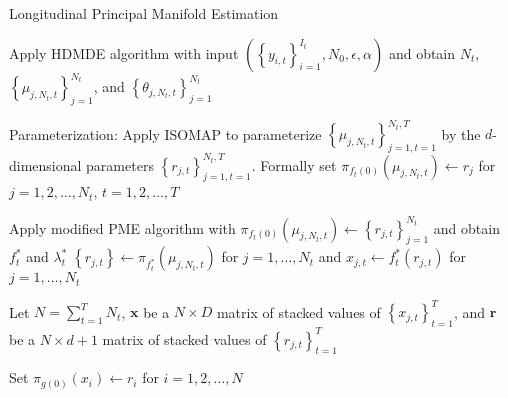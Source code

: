 \documentclass[11pt,reqno]{article}
\theoremstyle{definition}
\begin{document}
\begin{algorithm}
\caption{Longitudinal Principal Manifold Estimation}\label{alg:lpme}
 {
  Apply HDMDE algorithm with input $\left(\left\{y_{i, t}\right\}_{i = 1}^{I_t}, N_0, \epsilon, \alpha\right)$ and obtain $N_t$, $\left\{\mu_{j, N_t, t}\right\}_{j = 1}^{N_t}$, and $\left\{\theta_{j, N_t, t}\right\}_{j = 1}^{N_t}$\;
}

Parameterization: Apply ISOMAP to parameterize $\left\{\mu_{j, N_t, t}\right\}_{j = 1, t = 1}^{N_t, T}$ by the $d$-dimensional parameters $\left\{r_{j, t}\right\}_{j = 1, t = 1}^{N_t, T}$. Formally set $\pi_{f_t(0)}(\mu_{j, N_t, t}) \gets r_j$ for $j = 1, 2, \dots, N_t$, $t = 1, 2, \dots, T$\;

 {
  Apply modified PME algorithm with $\pi_{f_t(0)}(\mu_{j, N_t, t}) \gets \left\{r_{j, t}\right\}_{j = 1}^{N_t}$ and obtain $f_t^*$ and $\lambda_t^*$\;
  $\left\{r_{j, t}\right\} \gets \pi_{f_t^*}(\mu_{j, N_t, t})$ for $j = 1, \dots, N_t$ and $x_{j, t} \gets f_t^*(r_{j, t})$ for $j = 1, \dots, N_t$\;
}

Let $N = \sum_{t=1}^{T}N_t$, $\mathbf{x}$ be a $N \times D$ matrix of stacked values of $\left\{x_{j, t}\right\}_{t = 1}^T$, and $\mathbf{r}$ be a $N \times d + 1$ matrix of stacked values of $\left\{r_{j, t}\right\}_{t = 1}^T$ \;

Set $\pi_{g(0)}(x_i) \gets r_i$ for $i = 1, 2, \dots, N$\;


\end{algorithm}
\end{document}

